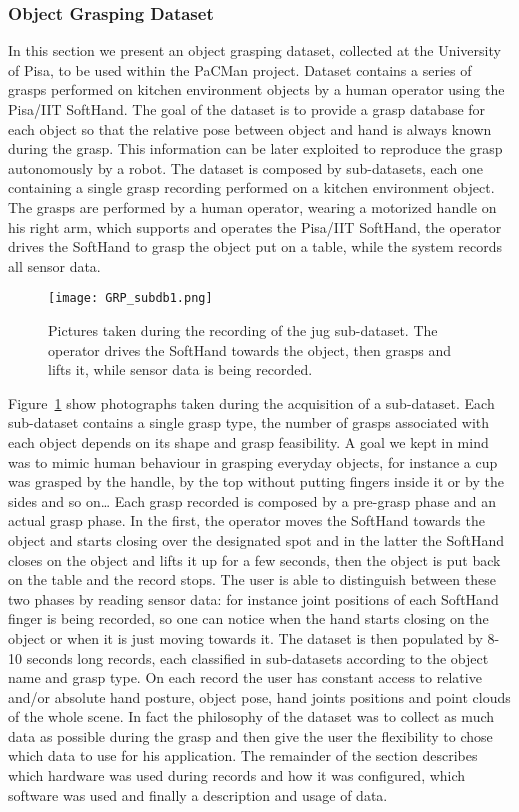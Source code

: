 
\subsubsection{Object Grasping Dataset}
\label{sec:ObjectGraspingDataset}

In this section we present an object grasping dataset, collected at the University of Pisa, to be used within the PaCMan project.
Dataset contains a series of grasps performed on kitchen environment objects by a human operator using the Pisa/IIT SoftHand.
The goal of the dataset is to provide a grasp database for each object so that the relative pose between object and hand is always known during the grasp. This information can be later 
exploited to reproduce the grasp autonomously by a robot. 
The dataset is composed by sub-datasets, each one containing a single grasp recording performed on a kitchen environment object. The grasps are performed by a human operator, wearing
a motorized handle on his right arm, which supports and operates the Pisa/IIT SoftHand, the operator drives the SoftHand to grasp the object put on a table, while the system records all sensor data. 
\begin{figure}[!tb]
  \centering
  \texttt{[image: GRP\_subdb1.png]}
  \caption{Pictures taken during the recording of the jug sub-dataset. The operator drives the SoftHand towards the object, then grasps and lifts it, while sensor data is being recorded.}
  \label{fig:grasp:subdb1}
\end{figure}
Figure~\ref{fig:grasp:subdb1} show photographs taken during the acquisition of a sub-dataset.
Each sub-dataset contains a single grasp type, the number of grasps associated with each object depends on its shape and grasp feasibility. A goal we kept in mind was to mimic human behaviour in grasping everyday objects,
for instance a cup was grasped by the handle, by the top without putting fingers inside it or by the sides and so on\ldots
Each grasp recorded is composed by a pre-grasp phase and an actual grasp phase. In the first, the operator moves the SoftHand towards the object and starts closing over the designated spot and in the latter the SoftHand 
closes on the object and lifts it up for a few seconds, then the object is put back on the table and the record stops. The user is able to distinguish between these two phases by reading sensor data: for instance joint positions
of each SoftHand finger is being recorded, so one can notice when the hand starts closing on the object or when it is just moving towards it.
The dataset is then populated by 8-10 seconds long records, each classified in sub-datasets according to the object name and grasp type. On each record the user has constant access to relative and/or absolute hand posture, object pose,
hand joints positions and point clouds of the whole scene. In fact the philosophy of the dataset was to collect as much data as possible during the grasp and then give the user the flexibility to chose which data to use for his application.
The remainder of the section describes which hardware was used during records and how it was configured, which software was used and finally a description and usage of data.

